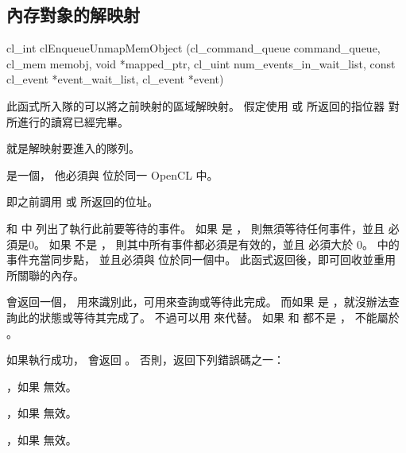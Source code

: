\subsection[section:unmap]{內存對象的解映射}


\startCLFUNC
cl_int clEnqueueUnmapMemObject (cl_command_queue command_queue,
			cl_mem memobj,
			void *mapped_ptr,
			cl_uint num_events_in_wait_list,
			const cl_event *event_wait_list,
			cl_event *event)
\stopCLFUNC

此函式所入隊的可以將之前映射的區域解映射。
假定使用  或  所返回的指位器
對  所進行的讀寫已經完畢。

 就是解映射要進入的隊列。

 是一個，
他必須與  位於同一 OpenCL 中。

 即之前調用 
或  所返回的位址。

 和  中
列出了執行此前要等待的事件。
如果  是 ，
則無須等待任何事件，並且  必須是0。
如果  不是 ，
則其中所有事件都必須是有效的，並且  必須大於 0。
 中的事件充當同步點，
並且必須與  位於同一個中。
此函式返回後，即可回收並重用  所關聯的內存。

 會返回一個，
用來識別此，可用來查詢或等待此完成。
而如果  是 ，就沒辦法查詢此的狀態或等待其完成了。
不過可以用  來代替。
如果  和  都不是 ，
 不能屬於 。

如果執行成功，  會返回 。
否則，返回下列錯誤碼之一：
\startigBase
\item {}，如果  無效。
\item {}，如果  無效。

\item {}，如果  無效。

